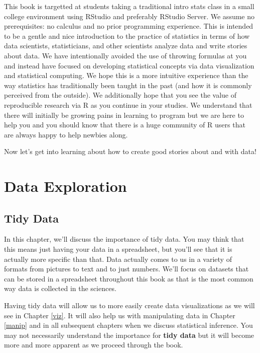 \documentclass[]{tufte-book}
\begin{document}
This book is targetted at students taking a traditional intro stats
class in a small college environment using RStudio and preferably
RStudio Server. We assume no prerequisites: no calculus and no prior
programming experience. This is intended to be a gentle and nice
introduction to the practice of statistics in terms of how data
scientists, statisticians, and other scientists analyze data and write
stories about data. We have intentionally avoided the use of throwing
formulas at you and instead have focused on developing statistical
concepts via data visualization and statistical computing. We hope this
is a more intuitive experience than the way statistics has traditionally
been taught in the past (and how it is commonly perceived from the
outside). We additionally hope that you see the value of reproducible
research via R as you continue in your studies. We understand that there
will initially be growing pains in learning to program but we are here
to help you and you should know that there is a huge community of R
users that are always happy to help newbies along.

Now let's get into learning about how to create good stories about and
with data!

\part{Data Exploration}\label{part-data-exploration}


\chapter{Tidy Data}\label{tidy}

In this chapter, we'll discuss the importance of tidy data. You may
think that this means just having your data in a spreadsheet, but you'll
see that it is actually more specific than that. Data actually comes to
us in a variety of formats from pictures to text and to just numbers.
We'll focus on datasets that can be stored in a spreadsheet throughout
this book as that is the most common way data is collected in the
sciences.

Having tidy data will allow us to more easily create data visualizations
as we will see in Chapter \ref{viz}. It will also help us with
manipulating data in Chapter \ref{manip} and in all subsequent chapters
when we discuss statistical inference. You may not necessarily
understand the importance for \textbf{tidy data} but it will become more
and more apparent as we proceed through the book.
\end{document}
